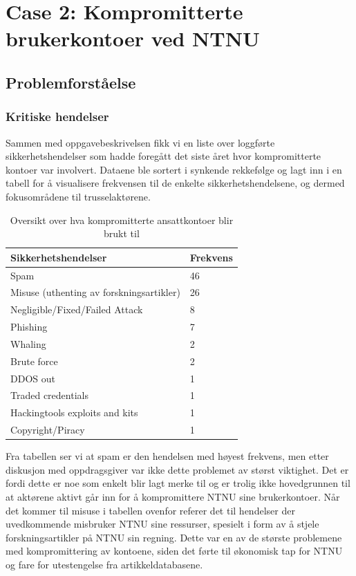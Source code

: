 \section{Case 2: Kompromitterte brukerkontoer ved NTNU}


\subsection{Problemforståelse}

\subsubsection{Kritiske hendelser}
Sammen med oppgavebeskrivelsen fikk vi en liste over loggførte sikkerhetshendelser som hadde foregått det siste året hvor kompromitterte kontoer var involvert. Dataene ble sortert i synkende rekkefølge og lagt inn i en tabell for å visualisere frekvensen til de enkelte sikkerhetshendelsene, og dermed fokusområdene til trusselaktørene. 

\begin{table} [H]
    \begin{tabular}{ | m{18em} | m{18em} | }
        \hline
            \cellcolor{yellow} Sikkerhetshendelser & \cellcolor{yellow} Frekvens \\
        \hline
            Spam & 46  \\
        \hline
            Misuse (uthenting av forskningsartikler) & 26 \\
        \hline
            Negligible/Fixed/Failed Attack  & 8 \\
        \hline
            Phishing & 7 \\
        \hline
            Whaling & 2 \\
        \hline
            Brute force & 2 \\
        \hline
            DDOS out & 1 \\
        \hline
            Traded credentials & 1 \\
        \hline
            Hackingtools exploits and kits & 1 \\
        \hline
            Copyright/Piracy & 1 \\
        \hline
    \end{tabular}
    \caption{Oversikt over hva kompromitterte ansattkontoer blir brukt til}
    \label{kritisk_tabell_2}
\end{table}

Fra tabellen ser vi at spam er den hendelsen med høyest frekvens, men etter diskusjon med oppdragsgiver var ikke dette problemet av størst viktighet. Det er fordi dette er noe som enkelt blir lagt merke til og er trolig ikke hovedgrunnen til at aktørene aktivt går inn for å kompromittere NTNU sine brukerkontoer. Når det kommer til misuse i tabellen ovenfor referer det til hendelser der uvedkommende misbruker NTNU sine ressurser, spesielt i form av å stjele forskningsartikler på NTNU sin regning. Dette var en av de største problemene med kompromittering av kontoene, siden det førte til økonomisk tap for NTNU og fare for utestengelse fra artikkeldatabasene. 

